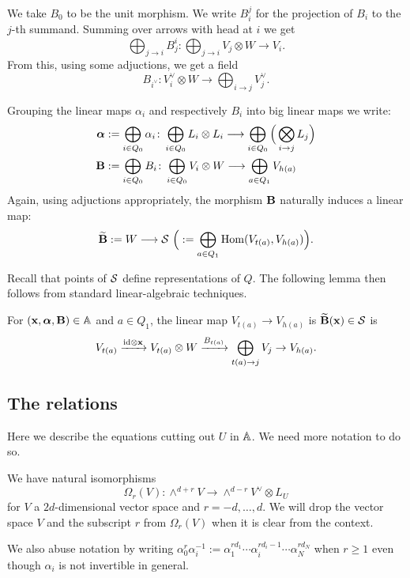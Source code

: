 \documentclass{amsart}
\newcommand{\balpha}{\boldsymbol{\alpha}}
\theoremstyle{definition}
\begin{document}
\begin{notation}
We take $B_0$ to be the unit morphism.
We write $B_i^j$ for the projection of $B_i$ to the $j$-th summand. 
Summing over arrows with head at $i$ we get $$\bigoplus_{j \rightarrow i} B_j^i \colon \bigoplus_{j \rightarrow i} V_j \otimes W \longrightarrow V_i.$$
From this, using some adjuctions, we get a field $$B_{i^\vee} \colon V_i^\vee \otimes W \longrightarrow \bigoplus_{i \rightarrow j} V_j^\vee.$$
\end{notation}

\begin{notation}
Grouping the linear maps $\alpha_i$ and respectively $B_i$ into big linear maps we write: 
\begin{align*}
\balpha &:= \bigoplus_{i\in Q_0} \alpha_i \colon \bigoplus_{i\in Q_0} L_i \otimes L_i \longrightarrow \bigoplus_{i \in Q_0} \Big( \bigotimes_{i \rightarrow j} L_j \Big) \\
\bfB &:= \bigoplus_{i\in Q_0} B_i \colon \bigoplus_{i\in Q_0} V_i \otimes W \longrightarrow \bigoplus_{a \in Q_1} V_{h(a)}
\end{align*}
Again, using adjuctions appropriately, the morphism $\mathbf{B}$ naturally induces a linear map:
$$\widetilde{\mathbf{B}} := W \longrightarrow \mathcal{S} \,\,\Big(:= \bigoplus_{a \in Q_1} \operatorname{Hom}(V_{t(a)}, V_{h(a)})\Big).$$
\end{notation}

Recall that points of $\mathcal{S}$ define representations of $Q$.
The following lemma then follows from standard linear-algebraic techniques.

\begin{lemma}\label{lem:Btilde}
For $(\bfx, \balpha, \bfB) \in \bA$ and $a \in Q_1$, the linear map $V_{t(a)} \rightarrow V_{h(a)}$ is $\widetilde{\mathbf{B}}(\mathbf{x}) \in \mathcal{S}$ is 
$$V_{t(a)} \xrightarrow{\textup{id} \otimes \mathbf{x}} V_{t(a)} \otimes W \xrightarrow{B_{t(a)}} \bigoplus_{t(a) \rightarrow j} V_j \rightarrow V_{h(a)}.$$
\end{lemma}

\subsection{The relations}
Here we describe the equations cutting out $U$ in $\mathbb{A}$.
We need more notation to do so.

\begin{notation}
We have natural isomorphisms
$$\Omega_r(V) \colon \wedge^{d+r} V \rightarrow \wedge^{d-r} V^\vee \otimes L_U$$ for $V$ a $2d$-dimensional vector space and $r= -d, \ldots, d$.
We will drop the vector space $V$ and the subscript $r$ from $\Omega_r(V)$ when it is clear from the context.

We also abuse notation by writing $\alpha_0^r \alpha_i^{-1} := \alpha_1^{rd_1} \cdots \alpha_i^{rd_i-1} \cdots \alpha_N^{rd_N}$ when $r\geq 1$ even though $\alpha_i$ is not invertible in general.
\end{notation}
\end{document}
